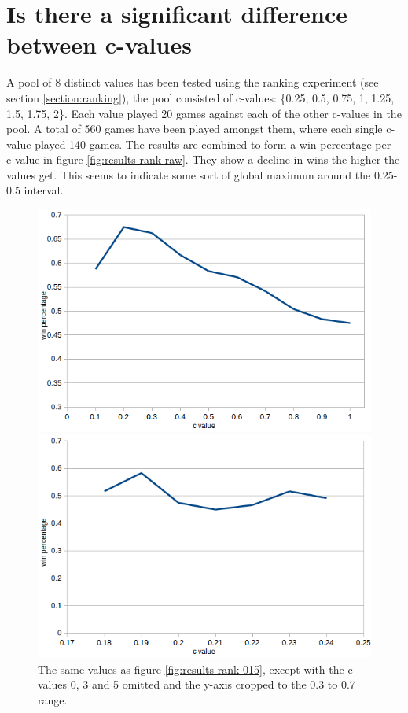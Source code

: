 \documentclass[
11pt, %
english, %
singlespacing, %
headsepline, %
]{MastersDoctoralThesis} %
\begin{document}
\section{Is there a significant difference between c-values}
A pool of 8 distinct values has been tested using the ranking experiment (see section \ref{section:ranking}), the pool consisted of c-values: \{0.25, 0.5, 0.75, 1, 1.25, 1.5, 1.75, 2\}. Each value played 20 games against each of the other c-values in the pool. A total of 560 games have been played amongst them, where each single c-value played 140 games. The results are combined to form a win percentage per c-value in figure \ref{fig:results-rank-raw}. They show a decline in wins the higher the values get. This seems to indicate some sort of global maximum around the 0.25-0.5 interval.

\begin{figure}[t]
	\captionsetup{width=.45\textwidth}
	\begin{minipage}[t]{0.5\textwidth}
		\includegraphics[width=\textwidth]{images/rank-01}
		\caption{The same values as figure \ref{fig:results-rank-015}, except with the c-values 0, 3 and 5 omitted and the y-axis cropped to the 0.3 to 0.7 range.}
		\label{fig:results-rank-01}
	\end{minipage}
	\begin{minipage}[t]{0.5\textwidth}
		\includegraphics[width=\textwidth]{images/rank-narrow}

\end{minipage}
\end{figure}
\end{document}
